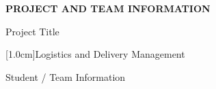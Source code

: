 \documentclass[11pt,a4paper]{article}
\newcommand{\blueheading}[1]{%
    {\sffamily\color{TitleBlue}\fontsize{15}{18}\selectfont #1}%
}
\newcommand{\bluebigheading}[1]{%
    {\sffamily\bfseries\color{TitleBlue}\fontsize{16}{19}\selectfont #1}%
}
\newcommand{\instruction}[1]{%
    {\itshape\fontsize{10.5}{12.5}\selectfont #1}%
}
\newcommand{\answerbox}[2][3.0cm]{%
    \vspace{2pt}
    \noindent
    \fbox{%
        \begin{minipage}[t][#1][t]{\dimexpr\textwidth-2\fboxsep-2\fboxrule\relax}
            \vspace{1mm}
            \itshape #2
        \end{minipage}
    }
}
\begin{document}
\vspace*{4mm}

\bluebigheading{PROJECT AND TEAM INFORMATION}

\vspace{13mm}

\blueheading{Project Title}

\vspace{1mm}

\instruction

\answerbox[1.0cm]{Logistics and Delivery Management}

\vspace{13mm}

\blueheading{Student / Team Information}

\vspace{2mm}

\noindent
\end{document}

